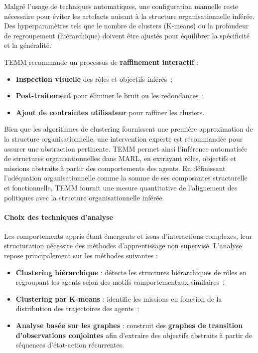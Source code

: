 Malgré l'usage de techniques automatiques, une configuration manuelle reste nécessaire pour éviter les artefacts nuisant à la structure organisationnelle inférée. Des hyperparamètres tels que le nombre de clusters (K-means) ou la profondeur de regroupement (hiérarchique) doivent être ajustés pour équilibrer la spécificité et la généralité.

TEMM recommande un processus de \textbf{raffinement interactif} :
\begin{itemize}
    \item \textbf{Inspection visuelle} des rôles et objectifs inférés~;
    \item \textbf{Post-traitement} pour éliminer le bruit ou les redondances~;
    \item \textbf{Ajout de contraintes utilisateur} pour raffiner les clusters.
\end{itemize}

Bien que les algorithmes de clustering fournissent une première approximation de la structure organisationnelle, une intervention experte est recommandée pour assurer une abstraction pertinente.
TEMM permet ainsi l'inférence automatisée de structures organisationnelles dans MARL, en extrayant rôles, objectifs et missions abstraits à partir des comportements des agents.
En définissant l'adéquation organisationnelle comme la somme de ses composantes structurelle et fonctionnelle, TEMM fournit une mesure quantitative de l'alignement des politiques avec la structure organisationnelle inférée.

\paragraph{Choix des techniques d'analyse}

Les comportements appris étant émergents et issus d'interactions complexes, leur structuration nécessite des méthodes d'apprentissage non supervisé. L'analyse repose principalement sur les méthodes suivantes :

\begin{itemize}
    \item \textbf{Clustering hiérarchique} : détecte les structures hiérarchiques de rôles en regroupant les agents selon des motifs comportementaux similaires~;
    \item \textbf{Clustering par K-means} : identifie les missions en fonction de la distribution des trajectoires des agents~;
    \item \textbf{Analyse basée sur les graphes} : construit des \textbf{graphes de transition d'observations conjointes} afin d'extraire des objectifs abstraits à partir de séquences d'état-action récurrentes.
\end{itemize}

